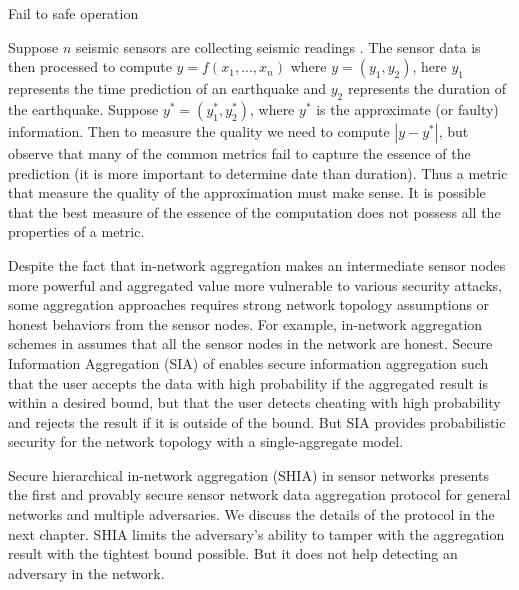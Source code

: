 	Fail to safe operation

		
	Suppose $n$ seismic sensors are collecting seismic readings \cite{zareafifi2012secure}.
	The sensor data is then processed to compute $y = f(x_{1},..., x_{n})$ where $y = (y_{1}, y_{2})$, here $y_{1}$ represents the time prediction of an earthquake and $y_{2}$ represents the duration of the earthquake. Suppose $y^* = (y^*_{1}, y^*_{2})$, where $y^*$ is the approximate (or faulty) information.
	Then to measure the quality we need to compute $|y - y^*|$, but observe that many of the common metrics fail to capture the essence of the prediction (it is more important to determine date than duration).
	Thus a metric that measure the quality of the approximation must make sense. 
	It is possible that the best measure of the essence of the computation does not possess all the	properties of a metric.

	Despite the fact that in-network aggregation makes an intermediate sensor nodes more powerful and aggregated value more vulnerable to various security attacks, some aggregation approaches requires strong network topology assumptions or honest behaviors from the sensor nodes.
	For example, in-network aggregation schemes in \cite{yao2002cougar, madden2003design} assumes that all the sensor nodes in the network are honest. 
	Secure Information Aggregation (SIA) of \cite{przydatek2003sia} enables secure information aggregation such that the user accepts the data with high probability if the aggregated result is within a desired bound, but that the user detects cheating with high probability and rejects the result if it is outside of the bound.
	But SIA provides probabilistic security for the network topology with a single-aggregate model.
	
	Secure hierarchical in-network aggregation (SHIA) in sensor networks \cite{chan2006secure} presents the first and provably secure sensor network data aggregation protocol for general networks and multiple adversaries. 
	We discuss the details of the protocol in the next chapter. 
	SHIA limits the adversary's ability to tamper with the aggregation result with the tightest bound possible.
	But it does not help detecting an adversary in the network.
